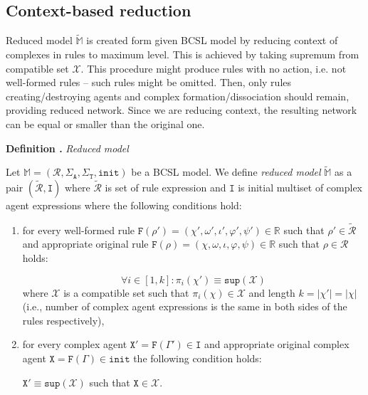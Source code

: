 \documentclass[12pt]{fithesis2}
\newcounter{counter}[section]
\renewcommand{\thecounter}{\thesection.\arabic{counter}}
\newenvironment{definition}[1]{\bigskip\refstepcounter{counter}\noindent\textbf{Definition \thecounter } \textit{#1} \par\nopagebreak}{\bigskip}
\begin{document}
\subsection{Context-based reduction}
\label{context_reduction}

Reduced model $\widetilde{\mathds{M}}$ is created form given BCSL model by reducing context of complexes in rules to maximum level. This is achieved by taking supremum from compatible set $\mathscr{X}$. This procedure might produce rules with no action, i.e. not well-formed rules -- such rules might be omitted. Then, only rules creating/destroying agents and complex formation/dissociation should remain, providing reduced network. Since we are reducing context, the resulting network can be equal or smaller than the original one.

\begin{definition}{Reduced model}
\label{reduced_model}
Let $\mathds{M} = (\mathcal{R}, \Sigma_\mathtt{A}, \Sigma_\mathtt{T}, \mathtt{init})$ be a BCSL model. We define \emph{reduced model} $\widetilde{\mathds{M}}$ as a pair $(\widetilde{\mathcal{R}}, \mathtt{I})$ where $\widetilde{\mathcal{R}}$ is set of rule expression and $\mathtt{I}$ is initial multiset of complex agent expressions where the following conditions hold:

\begin{enumerate}
	\item for every well-formed rule $\mathtt{F}(\rho') = (\chi', \omega', \iota', \varphi', \psi') \in \mathds{R}$ such that $\rho' \in \widetilde{\mathcal{R}}$ and appropriate original rule $\mathtt{F}(\rho) = (\chi, \omega, \iota, \varphi, \psi) \in \mathds{R}$ such that $\rho \in \mathcal{R}$ holds:

	$$\forall i \in [1, k]: \pi_i(\chi') \equiv \mathtt{sup}(\mathscr{X})$$ where $\mathscr{X}$ is a compatible set such that $\pi_i(\chi) \in \mathscr{X}$ and length $k = |\chi'| = |\chi|$ (i.e., number of complex agent expressions is the same in both sides of the rules respectively),

	\item for every complex agent $\mathtt{X}' = \mathtt{F}(\Gamma') \in \mathtt{I}$ and appropriate original complex agent $\mathtt{X} = \mathtt{F}(\Gamma) \in \mathtt{init}$ the following condition holds:

	\begin{center}
	$ \mathtt{X}' \equiv \mathtt{sup}(\mathscr{X}) $ such that $\mathtt{X} \in \mathscr{X}$.
	\end{center}

\end{enumerate}
\end{definition}
\end{document}
